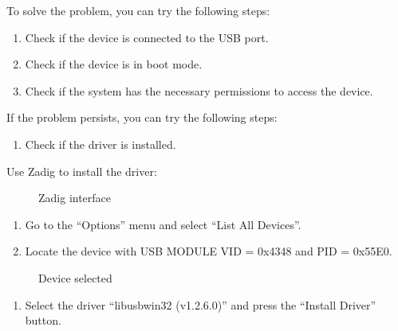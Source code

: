 \documentclass[letterpaper,10pt,english]{sphinxmanual}
\begin{document}
\sphinxAtStartPar
To solve the problem, you can try the following steps:
\begin{enumerate}
%
\item {} 
\sphinxAtStartPar
Check if the device is connected to the USB port.

\item {} 
\sphinxAtStartPar
Check if the device is in boot mode.

\item {} 
\sphinxAtStartPar
Check if the system has the necessary permissions to access the device.

\end{enumerate}

\sphinxAtStartPar
If the problem persists, you can try the following steps:
\begin{enumerate}
%
\item {} 
\sphinxAtStartPar
Check if the driver is installed.

\end{enumerate}

\sphinxAtStartPar
Use Zadig to install the driver:

\begin{figure}[htbp]
\centering
\capstart

\noindent{}
\caption{Zadig interface}\label{\detokenize{error:id1}}\label{\detokenize{error:figure-zadig}}\end{figure}
\begin{enumerate}
%
\item {} 
\sphinxAtStartPar
Go to the “Options” menu and select “List All Devices”.

\item {} 
\sphinxAtStartPar
Locate the device with USB MODULE VID = 0x4348 and PID = 0x55E0.

\end{enumerate}

\begin{figure}[htbp]
\centering
\capstart

\noindent{}
\caption{Device selected}\label{\detokenize{error:id2}}\label{\detokenize{error:figure-device}}\end{figure}
\begin{enumerate}
%
\setcounter{enumi}{2}
\item {} 
\sphinxAtStartPar
Select the driver “libusb\sphinxhyphen{}win32 (v1.2.6.0)” and press the “Install Driver” button.

\end{enumerate}
\end{document}
